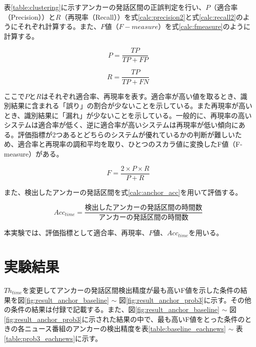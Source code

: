 {表\ref{table:clustering}に示すアンカーの発話区間の正誤判定を行い、$P$（適合率（Precision））と$R$（再現率（Recall））を式\ref{calc:precision2}と式\ref{calc:recall2}のようにそれぞれ計算する。また、$F$値（$F-measure$）を式\ref{calc:fmeasure}のように計算する。

\begin{equation}
\label{calc:precision2}
P = \frac{TP}{TP + FP}
\end{equation}

\begin{equation}
\label{calc:recall2}
R = \frac{TP}{TP + FN}
\end{equation}

ここで$P$と$R$はそれぞれ適合率、再現率を表す。適合率が高い値を取るとき、識別結果に含まれる「誤り」の割合が少ないことを示している。また再現率が高いとき、識別結果に「漏れ」が少ないことを示している。一般的に、再現率の高いシステムは適合率が低く、逆に適合率が高いシステムは再現率が低い傾向にある。評価指標が2つあるとどちらのシステムが優れているかの判断が難しいため、適合率と再現率の調和平均を取り、ひとつのスカラ値に変換したF値（F-measure）がある。

\begin{equation}
\label{calc:fmeasure}
F = \frac{2 \times P \times R}{P + R}
\end{equation}

また、検出したアンカーの発話区間を式\ref{calc:anchor_acc}を用いて評価する。

\begin{equation}
\label{calc:anchor_acc}
Acc_{time} = \frac{検出したアンカーの発話区間の時間数}{アンカーの発話区間の時間数}
\end{equation}

本実験では、評価指標として適合率、再現率、$F$値、$Acc_{time}$を用いる。

\section{実験結果}
$Th_{time}$を変更してアンカーの発話区間検出精度が最も高いF値を示した条件の結果を図\ref{fig:result_anchor_baseline} $\sim$ 図\ref{fig:result_anchor_prob3}に示す。その他の条件の結果は付録で記載する。また、図\ref{fig:result_anchor_baseline} $\sim$ 図\ref{fig:result_anchor_prob3}に示された結果の中で、最も高いF値をとった条件のときの各ニュース番組のアンカーの検出精度を表\ref{table:baseline_eachnews} $\sim$ 表\ref{table:prob3_eachnews}に示す。

}
